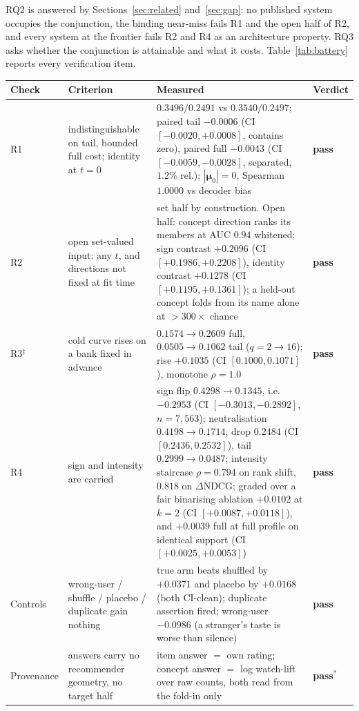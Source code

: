 \documentclass[acmsmall,review,anonymous]{acmart}
\newcommand{\bmu}{\boldsymbol{\mu}}
\begin{document}
RQ2 is answered by Sections~\ref{sec:related} and~\ref{sec:gap}: no published system occupies the conjunction, the binding near-miss fails R1 and the open half of R2, and every system at the frontier fails R2 and R4 as an architecture property. RQ3 asks whether the conjunction is attainable and what it costs. Table~\ref{tab:battery} reports every verification item.

\begin{table}[t]\centering\small
\setlength{\tabcolsep}{4pt}
\renewcommand{\arraystretch}{1.15}
\begin{tabular}{p{1.7cm}p{3.7cm}p{6.0cm}p{1.2cm}}
\toprule
Check & Criterion & Measured & Verdict \\
\midrule
R1 & indistinguishable on tail, bounded full cost; identity at $t{=}0$ & $0.3496/0.2491$ vs $0.3540/0.2497$; paired tail $-0.0006$ (CI $[-0.0020,+0.0008]$, contains zero), paired full $-0.0043$ (CI $[-0.0059,-0.0028]$, separated, $1.2\%$ rel.); $|\bmu_0|{=}0$, Spearman $1.0000$ vs decoder bias & \textbf{pass} \\
R2 & open set-valued input: any $t$, and directions not fixed at fit time & set half by construction. Open half: concept direction ranks its members at AUC $0.94$ whitened; sign contrast $+0.2096$ (CI $[+0.1986,+0.2208]$), identity contrast $+0.1278$ (CI $[+0.1195,+0.1361]$); a held-out concept folds from its name alone at $>300\times$ chance & \textbf{pass} \\
R3$^\ddagger$ & cold curve rises on a bank fixed in advance & $0.1574\!\to\!0.2609$ full, $0.0505\!\to\!0.1062$ tail ($q{=}2\!\to\!16$); rise $+0.1035$ (CI $[0.1000,0.1071]$), monotone $\rho{=}1.0$ & \textbf{pass} \\
R4 & sign and intensity are carried & sign flip $0.4298\!\to\!0.1345$, i.e.\ $-0.2953$ (CI $[-0.3013,-0.2892]$, $n{=}7{,}563$); neutralisation $0.4198\!\to\!0.1714$, drop $0.2484$ (CI $[0.2436,0.2532]$), tail $0.2999\!\to\!0.0487$; intensity staircase $\rho{=}0.794$ on rank shift, $0.818$ on $\Delta$NDCG; graded over a fair binarising ablation $+0.0102$ at $k{=}2$ (CI $[+0.0087,+0.0118]$), and $+0.0039$ full at full profile on identical support (CI $[+0.0025,+0.0053]$) & \textbf{pass} \\
\midrule
Controls & wrong-user / shuffle / placebo / duplicate gain nothing & true arm beats shuffled by $+0.0371$ and placebo by $+0.0168$ (both CI-clean); duplicate assertion fired; wrong-user $-0.0986$ (a stranger's taste is worse than silence) & \textbf{pass} \\
Provenance & answers carry no recommender geometry, no target half & item answer $=$ own rating; concept answer $=$ log watch-lift over raw counts, both read from the fold-in only & \textbf{pass}$^{*}$ \\

\end{tabular}
\end{table}
\end{document}
